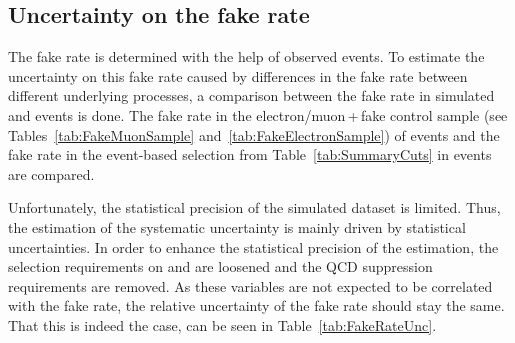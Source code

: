 \subsection{Uncertainty on the fake rate}
\label{sec:FakeRateUncertainty}
The fake rate \fakerate is determined with the help of observed \Zlep events.
To estimate the uncertainty on this fake rate caused by differences in the fake rate between different underlying processes, a comparison between the fake rate in simulated \ZlepJets and \WJets events is done.
The fake rate in the electron/muon\,+\,fake control sample (see Tables~\ref{tab:FakeMuonSample} and~\ref{tab:FakeElectronSample}) of \ZlepJets events 
and the fake rate in the event-based selection from Table~\ref{tab:SummaryCuts} in \WJets events are compared.

Unfortunately, the statistical precision of the simulated \WJets dataset is limited.
Thus, the estimation of the systematic uncertainty is mainly driven by statistical uncertainties.
In order to enhance the statistical precision of the estimation, the selection requirements on \met and \ptfirstjet are loosened and the QCD suppression requirements are removed.
As these variables are not expected to be correlated with the fake rate, the relative uncertainty of the fake rate should stay the same.
That this is indeed the case, can be seen in Table~\ref{tab:FakeRateUnc}.

\renewcommand{\arraystretch}{1.5}
\begin{table}[!h]
\centering
\caption{Fake rates in simulated \WJets and \ZlepJets events for different event-based selections of the \WJets sample. The track-based selection is the candidate track selection from Table~\ref{tab:SummaryCuts}.}
\label{tab:FakeRateUnc}
\end{table}

